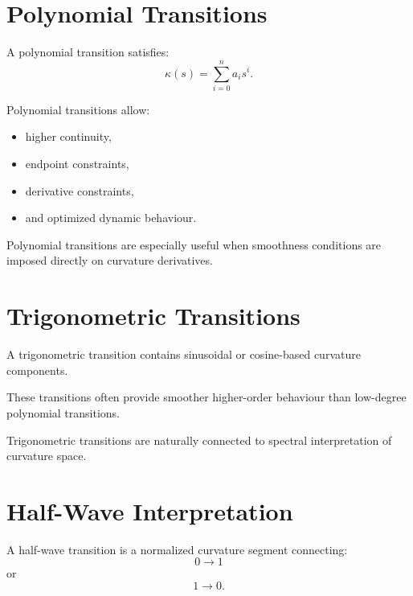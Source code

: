 \section{Polynomial Transitions}

\begin{definition}
\label{def:polynomial-transition}
A polynomial transition satisfies:
\[
\kappa(s)
=
\sum_{i=0}^n a_i s^i.
\]
\end{definition}

Polynomial transitions allow:
\begin{itemize}
\item higher continuity,
\item endpoint constraints,
\item derivative constraints,
\item and optimized dynamic behaviour.
\end{itemize}

Polynomial transitions are especially useful when smoothness conditions
are imposed directly on curvature derivatives.

\section{Trigonometric Transitions}

\begin{definition}
\label{def:trigonometric-transition}
A trigonometric transition contains sinusoidal or cosine-based curvature
components.
\end{definition}

These transitions often provide smoother higher-order behaviour than
low-degree polynomial transitions.

Trigonometric transitions are naturally connected to spectral
interpretation of curvature space.

\section{Half-Wave Interpretation}

\begin{definition}
\label{def:half-wave-transition}
A half-wave transition is a normalized curvature segment connecting:
\[
0 \rightarrow 1
\]
or
\[
1 \rightarrow 0.
\]
\end{definition}

